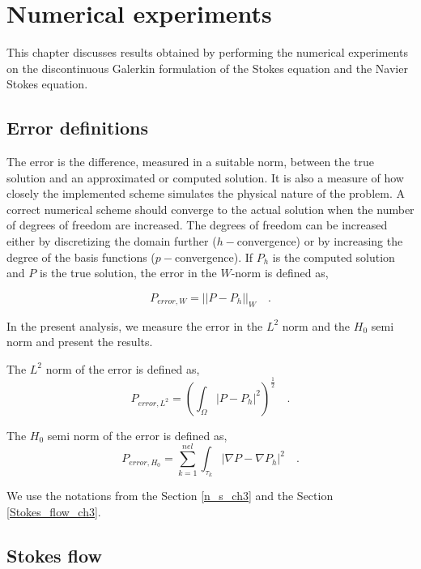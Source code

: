 \documentclass[a4paper,openany]{book}
\begin{document}
\chapter{Numerical experiments}

This chapter discusses results obtained by performing the numerical experiments on the discontinuous Galerkin formulation of the Stokes equation and the Navier Stokes equation.

\section{Error definitions}

The error is the difference, measured in a suitable norm, between the true solution and an approximated or computed solution. It is also a measure of how closely the implemented scheme simulates the physical nature of the problem. A correct numerical scheme should converge to the actual solution when the number of degrees of freedom are increased. The degrees of freedom can be increased either by discretizing the domain further ($h-$convergence) or by increasing the degree of the basis functions ($p-$convergence). If $P_h$ is the computed solution and $P$ is the true solution, the error in the $W$-norm is defined as,

\begin{equation} \label{error_definition}
P_{error,W} = ||P - P_h||_{W} \quad \mathrm{.}
\end{equation}

In the present analysis, we measure the error in the $L^2$ norm and the $H_0$ semi norm and present the results.

The $L^2$ norm of the error is defined as,
\begin{equation}
P_{error,L^2} = (\int_{\Omega} |P - P_h|^2)^{\frac{1}{2}} \quad \mathrm{.}
\end{equation}

The $H_0$ semi norm of the error is defined as,\begin{equation}
P_{error,H_0} = \sum_{k=1}^{nel} \int_{\tau_k} |\nabla P - \nabla P_h|^2 \quad \mathrm{.}
\end{equation}

We use the notations from the Section \ref{n_s_ch3} and the Section \ref{Stokes_flow_ch3}.

\section{Stokes flow}\label{Stokes-ch5}
\end{document}
